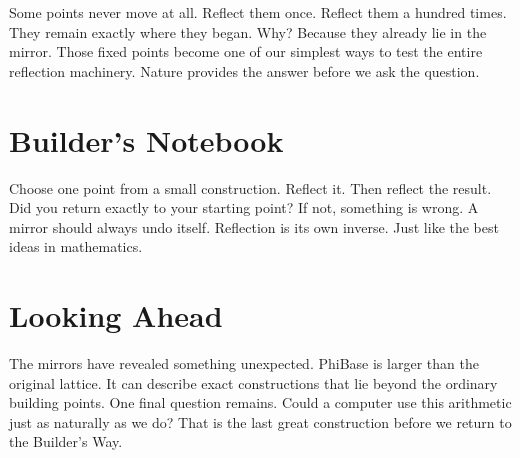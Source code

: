 Some points never move at all. Reflect them once. Reflect them a hundred times. They remain exactly where they began. Why? Because they already lie in the mirror. Those fixed points become one of our simplest ways to test the entire reflection machinery. Nature provides the answer before we ask the question.

\section*{Builder's Notebook}

Choose one point from a small construction. Reflect it. Then reflect the result. Did you return exactly to your starting point? If not, something is wrong. A mirror should always undo itself. Reflection is its own inverse. Just like the best ideas in mathematics.

\section*{Looking Ahead}

The mirrors have revealed something unexpected. PhiBase is larger than the original lattice. It can describe exact constructions that lie beyond the ordinary building points. One final question remains. Could a computer use this arithmetic just as naturally as we do? That is the last great construction before we return to the Builder's Way.
